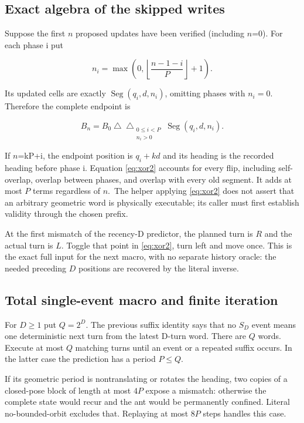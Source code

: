 \documentclass[
  11pt,
]{article}
\begin{document}
\subsection{Exact algebra of the skipped writes}\label{xor-4}

Suppose the first \(n\) proposed updates have been verified (including \(n\)=0).
For each phase i put

\[
n_i=\max\!\left(0,\left\lfloor\frac{n-1-i}{P}\right\rfloor+1\right).
\]

Its updated cells are exactly $\operatorname{Seg}(q_i,d,n_i)$, omitting phases with
$n_i=0$. Therefore the complete endpoint is

\begin{equation}\label{eq:xor2}
B_n=B_0\mathbin{\triangle}\mathop{\triangle}_{\substack{0\le i<P\\n_i>0}}\operatorname{Seg}(q_i,d,n_i).
\end{equation}

If \(n\)=kP+i, the endpoint position is $q_i+kd$ and its heading is the
recorded heading before phase i. Equation \eqref{eq:xor2} accounts for every
flip, including self-overlap, overlap between phases, and overlap with
every old segment. It adds at most \(P\) terms regardless of \(n\).~The helper
applying \eqref{eq:xor2} does not assert that an arbitrary geometric word is
physically executable; its caller must first establish validity through
the chosen prefix.

At the first mismatch of the recency-D predictor, the planned turn is \(R\)
and the actual turn is \(L\). Toggle that point in \eqref{eq:xor2}, turn left and
move once. This is the exact full input for the next macro, with no
separate history oracle: the needed preceding \(D\) positions are recovered
by the literal inverse.

\subsection{Total single-event macro and finite iteration}\label{xor-5}

For $D\ge1$ put $Q=2^D$. The previous suffix identity says that
no $S_D$ event means one deterministic next turn from the latest D-turn
word. There are \(Q\) words. Execute at most \(Q\) matching turns until an event
or a repeated suffix occurs. In the latter case the prediction has a
period $P\le Q$.

If its geometric period is nontranslating or rotates the heading, two
copies of a closed-pose block of length at most \(4P\) expose a mismatch:
otherwise the complete state would recur and the ant would be
permanently confined. Literal no-bounded-orbit excludes that. Replaying
at most \(8P\) steps handles this case.
\end{document}
